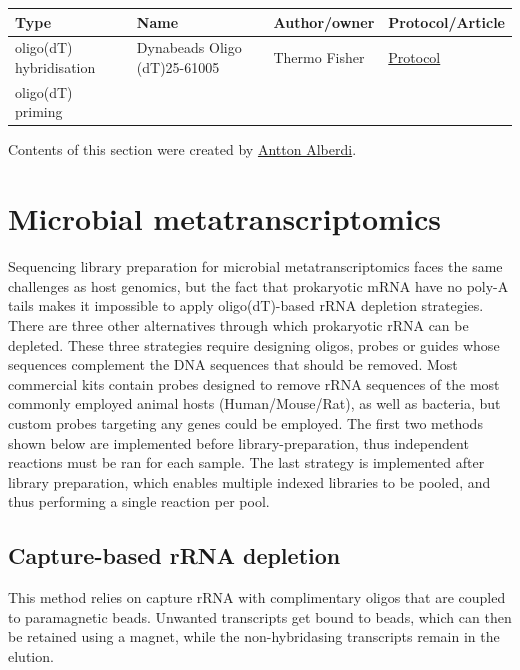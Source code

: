 \documentclass[
]{book}
\begin{document}
\begin{longtable}[]{@{}llll@{}}
\toprule
Type & Name & Author/owner & Protocol/Article \\
\midrule
\endhead
oligo(dT) hybridisation & Dynabeads Oligo (dT)25-61005 & Thermo Fisher & \href{https://www.thermofisher.com/dk/en/home/references/protocols/nucleic-acid-purification-and-analysis/mrna-protocols/dynabeads-oligo-dt-25-61002.html}{Protocol} \\
oligo(dT) priming & & & \\
\bottomrule
\end{longtable}

Contents of this section were created by \protect\hyperlink{antton-alberdi}{Antton Alberdi}.

\hypertarget{library-microbial-metatranscriptomics}{%
\section{Microbial metatranscriptomics}\label{library-microbial-metatranscriptomics}}

Sequencing library preparation for microbial metatranscriptomics faces the same challenges as host genomics, but the fact that prokaryotic mRNA have no poly-A tails makes it impossible to apply oligo(dT)-based rRNA depletion strategies. There are three other alternatives through which prokaryotic rRNA can be depleted. These three strategies require designing oligos, probes or guides whose sequences complement the DNA sequences that should be removed. Most commercial kits contain probes designed to remove rRNA sequences of the most commonly employed animal hosts (Human/Mouse/Rat), as well as bacteria, but custom probes targeting any genes could be employed. The first two methods shown below are implemented before library-preparation, thus independent reactions must be ran for each sample. The last strategy is implemented after library preparation, which enables multiple indexed libraries to be pooled, and thus performing a single reaction per pool.

\hypertarget{capture-based-rrna-depletion}{%
\subsection*{Capture-based rRNA depletion}\label{capture-based-rrna-depletion}}

This method relies on capture rRNA with complimentary oligos that are coupled to paramagnetic beads. Unwanted transcripts get bound to beads, which can then be retained using a magnet, while the non-hybridasing transcripts remain in the elution.
\end{document}
